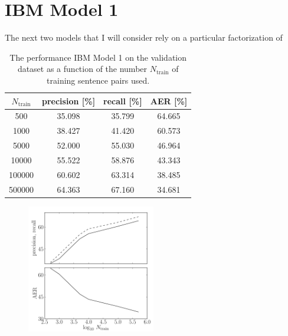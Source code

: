 \documentclass[11pt]{article}
\newcommand{\figlabel}[1]{\label{fig:#1}}
\begin{document}
\section{IBM Model 1}

The next two models that I will consider rely on a particular factorization of

\begin{table}[htbp]
\begin{center}
\begin{tabular}{c ccc}
\toprule
$N_\mathrm{train}$ & precision [\%] & recall [\%] & AER [\%] \\\midrule
500 & 35.098 & 35.799 & 64.665 \\
1000 & 38.427 & 41.420 & 60.573 \\
5000 & 52.000 & 55.030 & 46.964 \\
10000 & 55.522 & 58.876 & 43.343 \\
100000 & 60.602 & 63.314 & 38.485 \\
500000 & 64.363 & 67.160 & 34.681 \\
\bottomrule
\end{tabular}
\end{center}
\caption{%
The performance IBM Model 1 on the validation dataset
as a function of the number $N_\mathrm{train}$ of training sentence pairs used.
\label{tab:model1}}
\end{table}

\begin{figure}[htbp]
\begin{center}
    \includegraphics[width=0.5\textwidth]{model1.pdf}
\end{center}
\caption{%
\figlabel{model1}}
\end{figure}
\end{document}
